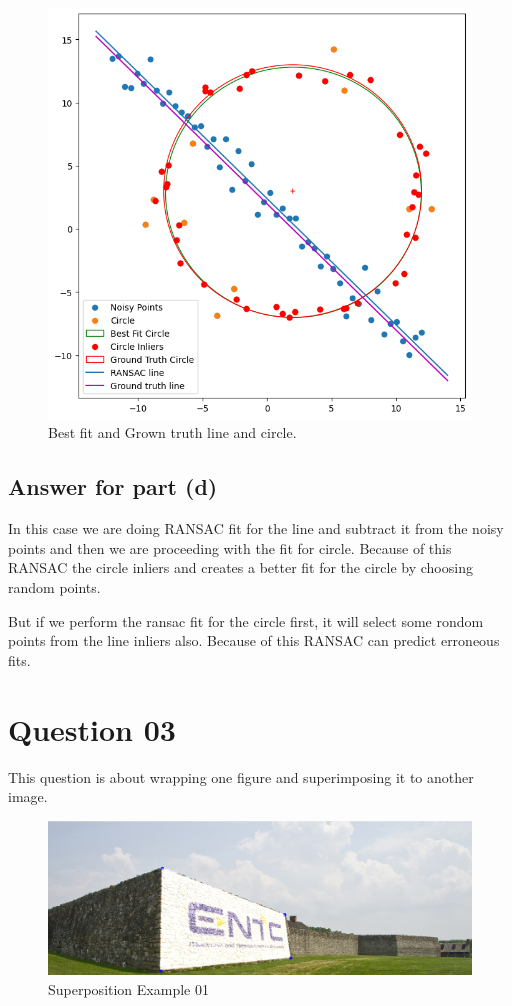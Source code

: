 \documentclass[11pt,a4paper]{article}
\begin{document}
{\begin{figure}[h]
    \centering
    \includegraphics[width=1.0\linewidth]{images/23.png}
    \caption{Best fit and Grown truth line and circle.}
\end{figure}}

\subsection{Answer for part (d)}

In this case we are doing RANSAC fit for the line and subtract it from the noisy points and then we are proceeding with the fit for circle. Because of this RANSAC the circle inliers and creates a better fit for the circle by choosing random points.

But if we perform the ransac fit for the circle first, it will select some rondom points from the line inliers also. Because of this RANSAC can predict erroneous fits.
\section{Question 03}
This question is about wrapping one figure and superimposing it to another image.

\lstset{style=mystyle}


{\begin{figure}[h]
    \centering
    \includegraphics[width=1.0\linewidth]{images/3.png}
    \caption{Superposition Example 01}
\end{figure}}
\end{document}
